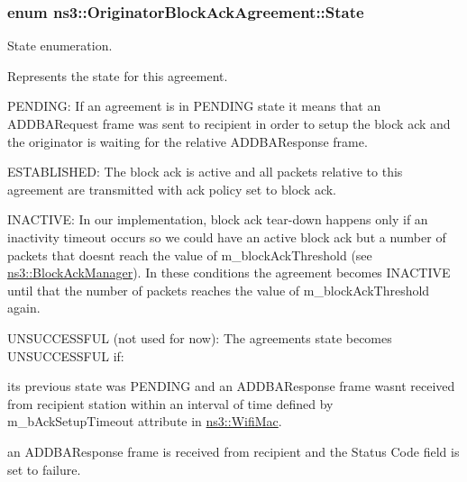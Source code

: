 \subsubsection[{\texorpdfstring{State}{State}}]{\setlength{\rightskip}{0pt plus 5cm}enum {\bf ns3\+::\+Originator\+Block\+Ack\+Agreement\+::\+State}}\hypertarget{classns3_1_1OriginatorBlockAckAgreement_ab33ae8af8c458aca7437a472778e4761}{}\label{classns3_1_1OriginatorBlockAckAgreement_ab33ae8af8c458aca7437a472778e4761}


State enumeration. 

Represents the state for this agreement.

P\+E\+N\+D\+I\+NG\+: If an agreement is in P\+E\+N\+D\+I\+NG state it means that an A\+D\+D\+B\+A\+Request frame was sent to recipient in order to setup the block ack and the originator is waiting for the relative A\+D\+D\+B\+A\+Response frame.

E\+S\+T\+A\+B\+L\+I\+S\+H\+ED\+: The block ack is active and all packets relative to this agreement are transmitted with ack policy set to block ack.

I\+N\+A\+C\+T\+I\+VE\+: In our implementation, block ack tear-\/down happens only if an inactivity timeout occurs so we could have an active block ack but a number of packets that doesn\textquotesingle{}t reach the value of m\+\_\+block\+Ack\+Threshold (see \hyperlink{classns3_1_1BlockAckManager}{ns3\+::\+Block\+Ack\+Manager}). In these conditions the agreement becomes I\+N\+A\+C\+T\+I\+VE until that the number of packets reaches the value of m\+\_\+block\+Ack\+Threshold again.

U\+N\+S\+U\+C\+C\+E\+S\+S\+F\+UL (not used for now)\+: The agreement\textquotesingle{}s state becomes U\+N\+S\+U\+C\+C\+E\+S\+S\+F\+UL if\+:


\begin{DoxyItemize}
\item its previous state was P\+E\+N\+D\+I\+NG and an A\+D\+D\+B\+A\+Response frame wasn\textquotesingle{}t received from recipient station within an interval of time defined by m\+\_\+b\+Ack\+Setup\+Timeout attribute in \hyperlink{classns3_1_1WifiMac}{ns3\+::\+Wifi\+Mac}.
\item an A\+D\+D\+B\+A\+Response frame is received from recipient and the Status Code field is set to failure.
\end{DoxyItemize}

